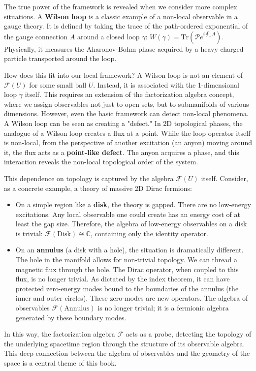 The true power of the framework is revealed when we consider more complex situations. A \textbf{Wilson loop} is a classic example of a non-local observable in a gauge theory. It is defined by taking the trace of the path-ordered exponential of the gauge connection $A$ around a closed loop $\gamma$: $W(\gamma) = \text{Tr} \left( \mathcal{P} e^{i \oint_\gamma A} \right)$. Physically, it measures the Aharonov-Bohm phase acquired by a heavy charged particle transported around the loop.

How does this fit into our local framework? A Wilson loop is not an element of $\mathcal{F}(U)$ for some small ball $U$. Instead, it is associated with the 1-dimensional loop $\gamma$ itself. This requires an extension of the factorization algebra concept, where we assign observables not just to open sets, but to submanifolds of various dimensions. However, even the basic framework can detect non-local phenomena. A Wilson loop can be seen as creating a "defect." In 2D topological phases, the analogue of a Wilson loop creates a flux at a point. While the loop operator itself is non-local, from the perspective of another excitation (an anyon) moving around it, the flux acts as a \textbf{point-like defect}. The anyon acquires a phase, and this interaction reveals the non-local topological order of the system.

This dependence on topology is captured by the algebra $\mathcal{F}(U)$ itself. Consider, as a concrete example, a theory of massive 2D Dirac fermions:
\begin{itemize}
    \item On a simple region like a \textbf{disk}, the theory is gapped. There are no low-energy excitations. Any local observable one could create has an energy cost of at least the gap size. Therefore, the algebra of low-energy observables on a disk is trivial: $\mathcal{F}(\text{Disk}) \cong \mathbb{C}$, containing only the identity operator.
    \item On an \textbf{annulus} (a disk with a hole), the situation is dramatically different. The hole in the manifold allows for non-trivial topology. We can thread a magnetic flux through the hole. The Dirac operator, when coupled to this flux, is no longer trivial. As dictated by the index theorem, it can have protected zero-energy modes bound to the boundaries of the annulus (the inner and outer circles). These zero-modes are new operators. The algebra of observables $\mathcal{F}(\text{Annulus})$ is no longer trivial; it is a fermionic algebra generated by these boundary modes.
\end{itemize}
In this way, the factorization algebra $\mathcal{F}$ acts as a probe, detecting the topology of the underlying spacetime region through the structure of its observable algebra. This deep connection between the algebra of observables and the geometry of the space is a central theme of this book.


